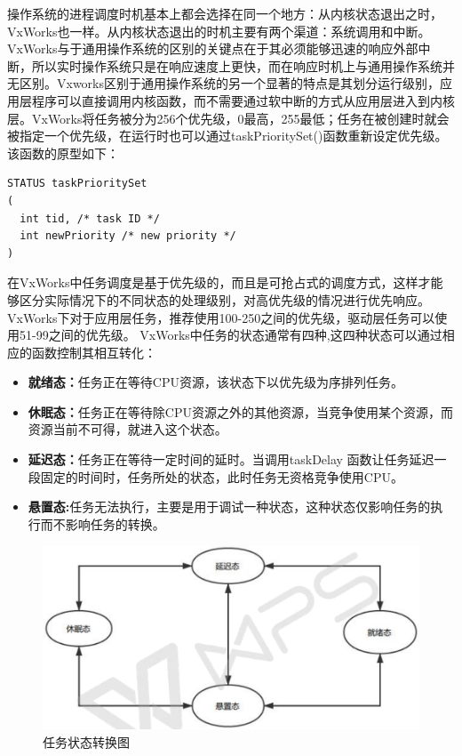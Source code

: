 	操作系统的进程调度时机基本上都会选择在同一个地方：从内核状态退出之时，VxWorks也一样。从内核状态退出的时机主要有两个渠道：系统调用和中断。VxWorks与于通用操作系统的区别的关键点在于其必须能够迅速的响应外部中断，所以实时操作系统只是在响应速度上更快，而在响应时机上与通用操作系统并无区别。Vxworks区别于通用操作系统的另一个显著的特点是其划分运行级别，应用层程序可以直接调用内核函数，而不需要通过软中断的方式从应用层进入到内核层。VxWorks将任务被分为256个优先级，0最高，255最低；任务在被创建时就会被指定一个优先级，在运行时也可以通过taskPrioritySet()函数重新设定优先级。该函数的原型如下：
\lstset{language=C}
\begin{lstlisting}
STATUS taskPrioritySet
(
  int tid, /* task ID */
  int newPriority /* new priority */
) 
\end{lstlisting}
	
	在VxWorks中任务调度是基于优先级的，而且是可抢占式的调度方式，这样才能够区分实际情况下的不同状态的处理级别，对高优先级的情况进行优先响应。	VxWorks下对于应用层任务，推荐使用100-250之间的优先级，驱动层任务可以使用51-99之间的优先级。
	VxWorks中任务的状态通常有四种,这四种状态可以通过相应的函数控制其相互转化：
\begin{itemize}
\item \textbf{就绪态：}任务正在等待CPU资源，该状态下以优先级为序排列任务。
\item \textbf{休眠态：}任务正在等待除CPU资源之外的其他资源，当竞争使用某个资源，而资源当前不可得，就进入这个状态。
\item \textbf{延迟态：}任务正在等待一定时间的延时。当调用taskDelay 函数让任务延迟一段固定的时间时，任务所处的状态，此时任务无资格竞争使用CPU。
\item \textbf{悬置态:}任务无法执行，主要是用于调试一种状态，这种状态仅影响任务的执行而不影响任务的转换。
\end{itemize}

\begin{figure}[!h]
\centering
\includegraphics[width=.9\textwidth]{./graphics/vxworks-task-shift-diagram.pdf}
\caption{任务状态转换图}\label{fig:VxWorks状态转换图}
\end{figure}

